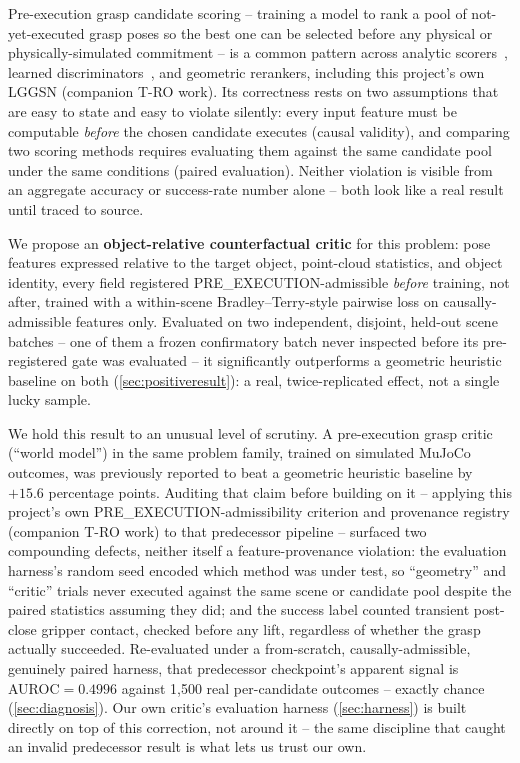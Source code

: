 \documentclass[journal]{IEEEtran}
\begin{document}
Pre-execution grasp candidate scoring -- training a model to rank a pool of
not-yet-executed grasp poses so the best one can be selected before any
physical or physically-simulated commitment -- is a common pattern across
analytic scorers~\cite{mahler2017dexnet}, learned
discriminators~\cite{graspgen2025}, and geometric rerankers, including this
project's own LGGSN (companion T-RO work). Its correctness rests on two
assumptions that are easy to state and easy to violate silently: every
input feature must be computable \emph{before} the chosen candidate
executes (causal validity), and comparing two scoring methods requires
evaluating them against the same candidate pool under the same conditions
(paired evaluation). Neither violation is visible from an aggregate accuracy
or success-rate number alone -- both look like a real result until traced
to source.

We propose an \textbf{object-relative counterfactual critic} for this
problem: pose features expressed relative to the target object,
point-cloud statistics, and object identity, every field registered
PRE\_EXECUTION-admissible \emph{before} training, not after, trained with a
within-scene Bradley--Terry-style pairwise loss on causally-admissible
features only. Evaluated on two independent, disjoint, held-out scene
batches -- one of them a frozen confirmatory batch never inspected before
its pre-registered gate was evaluated -- it significantly outperforms a
geometric heuristic baseline on both (\cref{sec:positiveresult}): a real,
twice-replicated effect, not a single lucky sample.

We hold this result to an unusual level of scrutiny. A pre-execution grasp
critic (``world model'') in the same problem family, trained on simulated
MuJoCo outcomes, was previously reported to beat a geometric heuristic
baseline by $+15.6$ percentage points. Auditing that claim before building
on it -- applying this project's own PRE\_EXECUTION-admissibility criterion
and provenance registry (companion T-RO work) to that predecessor pipeline
-- surfaced two compounding defects, neither itself a feature-provenance
violation: the evaluation harness's random seed encoded which method was
under test, so ``geometry'' and ``critic'' trials never executed against
the same scene or candidate pool despite the paired statistics assuming
they did; and the success label counted transient post-close gripper
contact, checked before any lift, regardless of whether the grasp actually
succeeded. Re-evaluated under a from-scratch, causally-admissible,
genuinely paired harness, that predecessor checkpoint's apparent signal is
AUROC$=0.4996$ against 1,500 real per-candidate outcomes -- exactly chance
(\cref{sec:diagnosis}). Our own critic's evaluation harness
(\cref{sec:harness}) is built directly on top of this correction, not
around it -- the same discipline that caught an invalid predecessor result
is what lets us trust our own.
\end{document}
